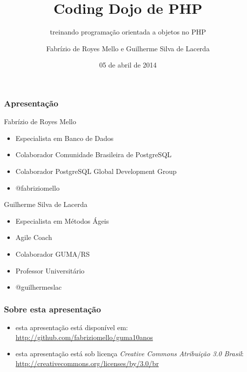 \documentclass{beamer}
\title{Coding Dojo de PHP}
\subtitle{treinando programação orientada a objetos no PHP}
\author[Fabrízio Mello]{Fabrízio de Royes Mello e Guilherme Silva de Lacerda}
\institute{\#guma10anos - Grupo de Usuários de Métodos Ágeis do RS\\
\url{http://codingbyexample.org}}
\date[guma10anos]{05 de abril de 2014}
\begin{document}
\begin{frame}
	\titlepage
\end{frame}



\begin{frame}
	\frametitle{Apresentação}
	\begin{block}{Fabrízio de Royes Mello}
		\begin{itemize}
			\item Especialista em Banco de Dados
			\item Colaborador Comunidade Brasileira de PostgreSQL
			\item Colaborador PostgreSQL Global Development Group
			\item @fabriziomello
		\end{itemize}
	\end{block}
	\begin{block}{Guilherme Silva de Lacerda}
		\begin{itemize}
			\item Especialista em Métodos Ágeis
			\item Agile Coach
			\item Colaborador GUMA/RS
			\item Professor Universitário
			\item @guilhermeslac
		\end{itemize}
	\end{block}
\end{frame}

\begin{frame}
	\frametitle{Sobre esta apresentação}
	\begin{itemize}
		\item esta apresentação está disponível em: \url{http://github.com/fabriziomello/guma10anos}
		\item esta apresentação está sob licença \textit{Creative Commons Atribuição 3.0 Brasil}: \url{http://creativecommons.org/licenses/by/3.0/br}
	\end{itemize}
\end{frame}
\end{document}
